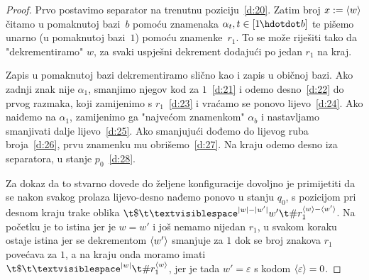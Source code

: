 \begin{proof}
	Prvo postavimo separator na trenutnu poziciju~\eqref{d:20}. Zatim broj $x:=\langle w\rangle$ čitamo u pomaknutoj bazi~$b$ pomoću znamenaka $\alpha_t,t\in[1\mspace{-1mu}\dd b]$ te pišemo unarno (u pomaknutoj bazi~$1$) pomoću znamenke~$r_1$. To se može riješiti tako da "dekrementiramo" $w$, za svaki uspješni dekrement dodajući po jedan $r_1$ na kraj.

Zapis u pomaknutoj bazi dekrementiramo slično kao i zapis u običnoj bazi. Ako zadnji znak nije $\alpha_1$, smanjimo njegov kod za $1$~\eqref{d:21} i odemo desno~\eqref{d:22} do prvog razmaka, koji zamijenimo s $r_1$~\eqref{d:23} i vraćamo se ponovo lijevo~\eqref{d:24}. Ako naiđemo na $\alpha_1$, zamijenimo ga "najvećom znamenkom" $\alpha_b$ i nastavljamo smanjivati dalje lijevo~\eqref{d:25}. Ako smanjujući dođemo do lijevog ruba broja~\eqref{d:26}, prvu znamenku mu obrišemo~\eqref{d:27}. %
Na kraju odemo desno iza separatora, u stanje $p_0$~\eqref{d:28}.

Za dokaz da to stvarno dovede do željene konfiguracije dovoljno je primijetiti da se nakon svakog prolaza lijevo-desno  nađemo ponovo u stanju $q_0$, s pozicijom pri desnom kraju trake oblika $\t\$\bl^{\dulj w-\dulj{w'}}w'\t\#r_1^{\kr w-\kr{w'}}$. Na početku je to istina jer je $w=w'$ i još nemamo nijedan $r_1$, u svakom koraku ostaje istina jer se dekrementom $\langle w'\rangle$ smanjuje za $1$ dok se broj znakova $r_1$ povećava za $1$, a na kraju onda moramo imati $\t\$\bl^{\dulj w}\t\#r_1^{\kr w}$, jer je tada $w'=\varepsilon$ s kodom $\langle\varepsilon\rangle=0$.
\end{proof}


